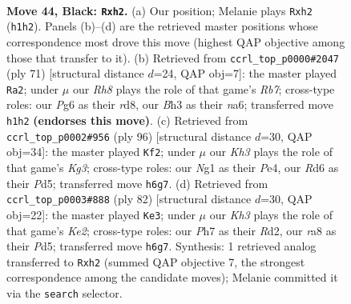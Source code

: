 \documentclass[11pt]{article}
\begin{document}
\clearpage

\begin{figure}[p]\centering
\begin{subfigure}{0.46\textwidth}\centering
\resizebox{\linewidth}{!}{%
\newchessgame
\chessboard[
  setfen={R7/5p1p/3r2pk/8/1p2P3/4K1Pb/7P/6nr b - - 5 44},
  showmover=false,
  pgfstyle=straightmove, color=movearrow, markmove={h1-h2}
]}
\caption{}
\end{subfigure}\hfill
\begin{subfigure}{0.46\textwidth}\centering
\resizebox{\linewidth}{!}{%
\newchessgame
\chessboard[
  setfen={3R4/5ppk/N4n1p/Pp6/8/5PP1/1r3P2/6K1 b - - 0 36},
  showmover=false,
  pgfstyle=straightmove, color=movearrow, markmove={b2-a2}
]}
\caption{}
\end{subfigure}
\\[4pt]
\begin{subfigure}{0.46\textwidth}\centering
\resizebox{\linewidth}{!}{%
\newchessgame
\chessboard[
  setfen={r7/4k2p/8/3P2p1/1pR1P1P1/1Pp3K1/6P1/8 w - - 1 49},
  showmover=false,
  pgfstyle=straightmove, color=movearrow, markmove={g3-f2}
]}
\caption{}
\end{subfigure}\hfill
\begin{subfigure}{0.46\textwidth}\centering
\resizebox{\linewidth}{!}{%
\newchessgame
\chessboard[
  setfen={6k1/6p1/3N1p2/2pPn2p/4P3/6P1/3RK2P/7r w - - 4 42},
  showmover=false,
  pgfstyle=straightmove, color=movearrow, markmove={e2-e3}
]}
\caption{}
\end{subfigure}
\caption{\textbf{Move 44, Black: \texttt{Rxh2}.} (a) Our position; Melanie plays \texttt{Rxh2} (\texttt{h1h2}). Panels (b)--(d) are the retrieved master positions whose correspondence most drove this move (highest QAP objective among those that transfer to it). (b) Retrieved from \texttt{ccrl\_top\_p0000\#2047} (ply 71) [structural distance $d$=24, QAP obj=7]: the master played \texttt{Ra2}; under $\mu$ our \emph{Rh8} plays the role of that game's \emph{Rb7}; cross-type roles: our \emph{P}g6 as their \emph{r}d8, our \emph{B}h3 as their \emph{n}a6; transferred move \texttt{h1h2} \textbf{(endorses this move)}. (c) Retrieved from \texttt{ccrl\_top\_p0002\#956} (ply 96) [structural distance $d$=30, QAP obj=34]: the master played \texttt{Kf2}; under $\mu$ our \emph{Kh3} plays the role of that game's \emph{Kg3}; cross-type roles: our \emph{N}g1 as their \emph{P}e4, our \emph{R}d6 as their \emph{P}d5; transferred move \texttt{h6g7}. (d) Retrieved from \texttt{ccrl\_top\_p0003\#888} (ply 82) [structural distance $d$=30, QAP obj=22]: the master played \texttt{Ke3}; under $\mu$ our \emph{Kh3} plays the role of that game's \emph{Ke2}; cross-type roles: our \emph{P}h7 as their \emph{R}d2, our \emph{r}a8 as their \emph{P}d5; transferred move \texttt{h6g7}. Synthesis: 1 retrieved analog transferred to \texttt{Rxh2} (summed QAP objective 7, the strongest correspondence among the candidate moves); Melanie committed it via the \texttt{search} selector.}
\label{fig:thought-m87}
\end{figure}
\end{document}
